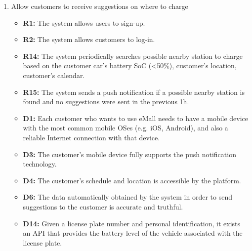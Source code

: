 \begin{enumerate}[label=\textbf{-G\arabic*}:]
          \item {Allow customers to receive suggestions on where to charge
          \begin{itemize}
            \item \textbf{R1:} The system allows users to sign-up.
            \item \textbf{R2:} The system allows customers to log-in.
            \item \textbf{R14:} The system periodically searches possible nearby station to charge based on the customer car's battery SoC (<50\%), customer's location, customer's calendar.
            \item \textbf{R15:} The system sends a push notification if a possible nearby station is found and no suggestions were sent in the previous 1h.
            \item \textbf{D1:} Each customer who wants to use eMall needs to have a mobile device with the most common mobile OSes (e.g. iOS, Android), and also a reliable Internet connection with that device.
            \item \textbf{D3:} The customer's mobile device fully supports the push notification technology.
            \item \textbf{D4:} The customer's schedule and location is accessible by the platform.
            \item \textbf{D6:} The data automatically obtained by the system in order to send suggestions to the customer is accurate and truthful.
            \item \textbf{D14:} Given a license plate number and personal identification, it exists an API that provides the battery level of the vehicle associated with the license plate.
              
          \end{itemize}
          }



\end{enumerate}
